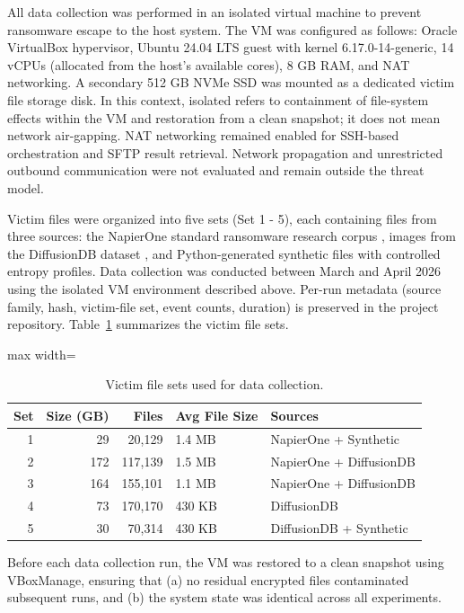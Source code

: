 All data collection was performed in an isolated virtual machine to prevent ransomware escape to the host system. The VM was configured as follows: Oracle VirtualBox hypervisor, Ubuntu 24.04 LTS guest with kernel 6.17.0-14-generic, 14 vCPUs (allocated from the host's available cores), 8 GB RAM, and NAT networking. A secondary 512 GB NVMe SSD was mounted as a dedicated victim file storage disk. In this context, isolated refers to containment of file-system effects within the VM and restoration from a clean snapshot; it does not mean network air-gapping. NAT networking remained enabled for SSH-based orchestration and SFTP result retrieval. Network propagation and unrestricted outbound communication were not evaluated and remain outside the threat model.

Victim files were organized into five sets (Set 1 - 5), each containing files from three sources: the NapierOne standard ransomware research corpus \cite{ref28}, images from the DiffusionDB dataset \cite{ref42}, and Python-generated synthetic files with controlled entropy profiles. Data collection was conducted between March and April 2026 using the isolated VM environment described above. Per-run metadata (source family, hash, victim-file set, event counts, duration) is preserved in the project repository. Table~\ref{tab:3-2} summarizes the victim file sets.

\begin{table}[htbp]
\centering
\caption{Victim file sets used for data collection.}\label{tab:3-2}
\begin{adjustbox}{max width=\textwidth}
\begin{tabular}{rrrll}
\hline
\textbf{Set} & \textbf{Size (GB)} & \textbf{Files} & \textbf{Avg File Size} & \textbf{Sources} \\
\hline
1 & 29 & 20,129 & 1.4 MB & NapierOne + Synthetic \\
2 & 172 & 117,139 & 1.5 MB & NapierOne + DiffusionDB \\
3 & 164 & 155,101 & 1.1 MB & NapierOne + DiffusionDB \\
4 & 73 & 170,170 & 430 KB & DiffusionDB \\
5 & 30 & 70,314 & 430 KB & DiffusionDB + Synthetic \\
\hline
\end{tabular}
\end{adjustbox}
\end{table}

Before each data collection run, the VM was restored to a clean snapshot using VBoxManage, ensuring that (a) no residual encrypted files contaminated subsequent runs, and (b) the system state was identical across all experiments.

